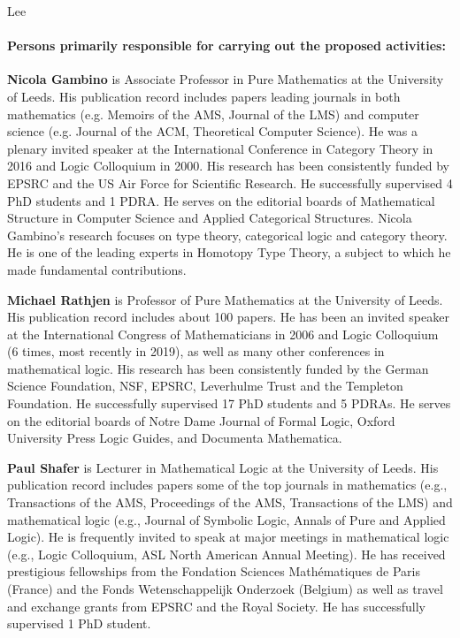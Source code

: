 \begin{sitedescription}{Lee}
\paragraph*{Persons primarily responsible for carrying out the proposed activities:}

\begin{compactitem}
\item \textbf{Nicola Gambino} is Associate Professor in Pure Mathematics at the University of Leeds. His publication record includes papers leading journals in both mathematics (e.g. Memoirs of the AMS,  Journal of the LMS) and computer science (e.g. Journal of the ACM, Theoretical Computer Science). He was a plenary invited speaker at the International Conference in Category Theory in 2016 and Logic Colloquium in 2000. His research has been consistently funded by EPSRC and the US Air Force for Scientific Research. He successfully supervised 4 PhD students and 1 PDRA. He serves on the editorial boards of Mathematical Structure in Computer Science and Applied Categorical Structures.
Nicola Gambino's research focuses on type theory, categorical logic and category theory. He is one of the leading experts in Homotopy Type Theory, a subject to which he made fundamental contributions.

\item \textbf{Michael Rathjen} is Professor of Pure Mathematics at the University of Leeds. His publication record includes about 100 papers. He has been an invited speaker at the International Congress of Mathematicians in 2006 and Logic Colloquium (6 times, most recently in 2019), as well as many
other conferences in mathematical logic. His research has been consistently funded by the German Science Foundation, NSF, EPSRC,
Leverhulme Trust and the Templeton Foundation. He successfully supervised 17 PhD students and 5 PDRAs. He serves on the editorial boards of  Notre Dame Journal of Formal Logic, Oxford University Press Logic Guides, and Documenta Mathematica.
\item \textbf{Paul Shafer} is Lecturer in Mathematical Logic at the University of Leeds.  His publication record includes papers some of the top journals in mathematics (e.g., Transactions of the AMS, Proceedings of the AMS, Transactions of the LMS) and mathematical logic (e.g., Journal of Symbolic Logic, Annals of Pure and Applied Logic).  He is frequently invited to speak at major meetings in mathematical logic (e.g., Logic Colloquium, ASL North American Annual Meeting).  He has received prestigious fellowships from the Fondation Sciences Mathématiques de Paris (France) and the Fonds Wetenschappelijk Onderzoek (Belgium) as well as travel and exchange grants from EPSRC and the Royal Society.  He has successfully supervised 1 PhD student.
\end{compactitem}




\end{sitedescription}

